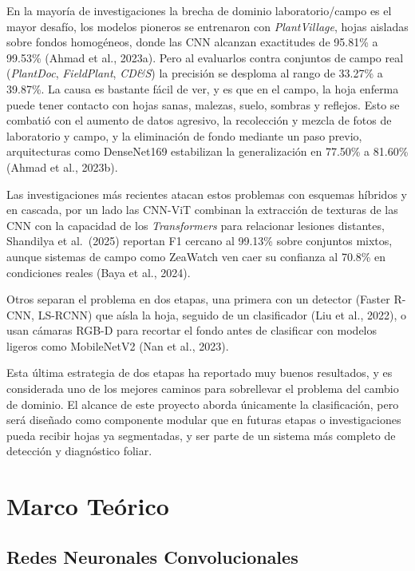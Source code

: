 \documentclass[12pt,letterpaper]{article}
\begin{document}
En la mayoría de investigaciones la brecha de dominio laboratorio/campo es el mayor desafío, los modelos pioneros se entrenaron con \textit{PlantVillage}, hojas aisladas sobre fondos homog\'eneos, donde las CNN alcanzan exactitudes de 95.81\% a 99.53\% (Ahmad et al., 2023a). Pero al evaluarlos contra conjuntos de campo real (\textit{PlantDoc}, \textit{FieldPlant}, \textit{CD\&S}) la precisi\'on se desploma al rango de 33.27\% a 39.87\%. La causa es bastante fácil de ver, y es que en el campo, la hoja enferma puede tener contacto con hojas sanas, malezas, suelo, sombras y reflejos. Esto se combatió con el aumento de datos agresivo, la recolección y mezcla de fotos de laboratorio y campo, y la eliminaci\'on de fondo mediante un paso previo, arquitecturas como DenseNet169 estabilizan la generalizaci\'on en 77.50\% a 81.60\% (Ahmad et al., 2023b).

Las investigaciones más recientes atacan estos problemas con esquemas h\'ibridos y en cascada, por un lado las CNN-ViT combinan la extracci\'on de texturas de las CNN con la capacidad de los \textit{Transformers} para relacionar lesiones distantes, Shandilya et al.\ (2025) reportan F1 cercano al 99.13\% sobre conjuntos mixtos, aunque sistemas de campo como ZeaWatch ven caer su confianza al 70.8\% en condiciones reales (Baya et al., 2024).

Otros separan el problema en dos etapas, una primera con un detector (Faster R-CNN, LS-RCNN) que a\'isla la hoja, seguido de un clasificador (Liu et al., 2022), o usan c\'amaras RGB-D para recortar el fondo antes de clasificar con modelos ligeros como MobileNetV2 (Nan et al., 2023).

Esta última estrategia de dos etapas ha reportado muy buenos resultados, y es considerada uno de los mejores caminos para sobrellevar el problema del cambio de dominio. El alcance de este proyecto aborda únicamente la clasificaci\'on, pero será dise\~nado como componente modular que en futuras etapas o investigaciones pueda recibir hojas ya segmentadas, y ser parte de un sistema más completo de detecci\'on y diagn\'ostico foliar.

\section{Marco Te\'orico}

\subsection{Redes Neuronales Convolucionales}
\end{document}
